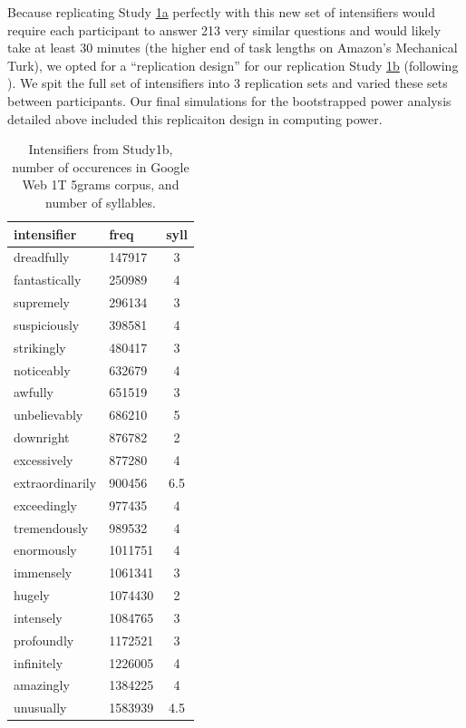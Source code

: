 \documentclass[10pt,letterpaper]{article}
\begin{document}
Because replicating Study \hyperref[sec:study1a]{1a} perfectly with this new set of intensifiers would require each participant to answer 213 very similar questions and would likely take at least 30 minutes (the higher end of task lengths on Amazon’s Mechanical Turk), we opted for a ``replication design'' for our replication Study \hyperref[sec:study1b]{1b} (following ). We spit the full set of intensifiers into 3 replication sets and varied these sets between participants. Our final simulations for the bootstrapped power analysis detailed above included this replicaiton design in computing power.

\begin{table}[ht]
 \begin{center}
 \footnotesize
  \caption{Intensifiers from Study1b, number of occurences in Google Web 1T 5grams corpus, and number of syllables.}
  \label{table:intensifiers_study1b}
  \begin{tabular}{llc}
   \hline
   intensifier & freq & syll \\
   \hline
    dreadfully & 147917 & 3 \\ 
    fantastically & 250989 & 4 \\ 
    supremely & 296134 & 3 \\ 
    suspiciously & 398581 & 4 \\ 
    strikingly & 480417 & 3 \\ 
    noticeably & 632679 & 4 \\ 
    awfully & 651519 & 3 \\ 
    unbelievably & 686210 & 5 \\ 
    downright & 876782 & 2 \\ 
    excessively & 877280 & 4 \\ 
    extraordinarily & 900456 & 6.5 \\ 
    exceedingly & 977435 & 4 \\ 
    tremendously & 989532 & 4 \\ 
    enormously & 1011751 & 4 \\ 
    immensely & 1061341 & 3 \\ 
    hugely & 1074430 & 2 \\ 
    intensely & 1084765 & 3 \\ 
    profoundly & 1172521 & 3 \\ 
    infinitely & 1226005 & 4 \\ 
    amazingly & 1384225 & 4 \\ 
    unusually & 1583939 & 4.5 \\ 

\end{tabular}
\end{center}
\end{table}
\end{document}
